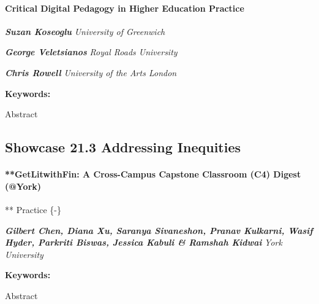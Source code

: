 \documentclass[
]{book}
\begin{document}
\begin{session}
\hypertarget{critical-digital-pedagogy-in-higher-education-practice}{%
\paragraph*{\texorpdfstring{\textbf{Critical Digital Pedagogy in Higher
Education} \textbar{}
Practice}{Critical Digital Pedagogy in Higher Education \textbar{} Practice}}\label{critical-digital-pedagogy-in-higher-education-practice}}

\textbf{\emph{Suzan Koseoglu}} \textbar{} \emph{University of Greenwich}

\textbf{\emph{George Veletsianos}} \textbar{} \emph{Royal Roads
University}

\textbf{\emph{Chris Rowell}} \textbar{} \emph{University of the Arts
London}

\textbf{Keywords:}

Abstract
\end{session}

\hypertarget{showcase-21.3-addressing-inequities}{%
\subsection*{Showcase 21.3 \textbar{} Addressing Inequities}\label{showcase-21.3-addressing-inequities}}

\begin{session}
\hypertarget{getlitwithfin-a-cross-campus-capstone-classroom-c4-digest-york}{%
\paragraph{**GetLitwithFin: A Cross-Campus Capstone Classroom (C4)
Digest
(@York)}\label{getlitwithfin-a-cross-campus-capstone-classroom-c4-digest-york}}

** \textbar{} Practice \{-\}

\textbf{\emph{Gilbert Chen, Diana Xu, Saranya Sivaneshon, Pranav
Kulkarni, Wasif Hyder, Parkriti Biswas, Jessica Kabuli \& Ramshah
Kidwai}} \textbar{} \emph{York University}

\textbf{Keywords:}

Abstract
\end{session}

  
\end{document}
